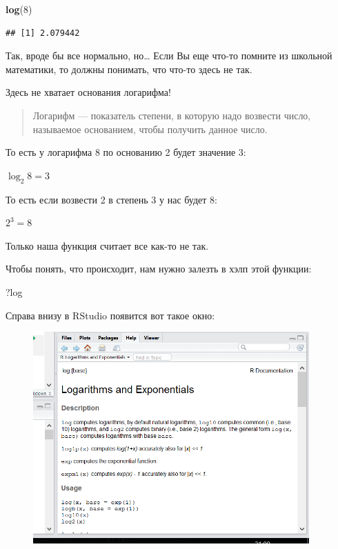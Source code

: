 \documentclass[]{book}
\newenvironment{Shaded}{\begin{snugshade}}{\end{snugshade}}
\newcommand{\KeywordTok}[1]{\textcolor[rgb]{0.13,0.29,0.53}{\textbf{#1}}}
\newcommand{\DecValTok}[1]{\textcolor[rgb]{0.00,0.00,0.81}{#1}}
\newcommand{\NormalTok}[1]{#1}
\begin{document}
\begin{Shaded}
\begin{Highlighting}[]
\KeywordTok{log}\NormalTok{(}\DecValTok{8}\NormalTok{)}
\end{Highlighting}
\end{Shaded}

\begin{verbatim}
## [1] 2.079442
\end{verbatim}

Так, вроде бы все нормально, но\ldots{} Если Вы еще что-то помните из
школьной математики, то должны понимать, что что-то здесь не так.

Здесь не хватает основания логарифма!

\begin{quote}
Логарифм --- показатель степени, в которую надо возвести число,
называемое основанием, чтобы получить данное число.
\end{quote}

То есть у логарифма 8 по основанию 2 будет значение 3:

\(\log_2 8 = 3\)

То есть если возвести 2 в степень 3 у нас будет 8:

\(2^3 = 8\)

Только наша функция считает все как-то не так.

Чтобы понять, что происходит, нам нужно залезть в хэлп этой функции:

\begin{Shaded}
\begin{Highlighting}[]
\NormalTok{?log}
\end{Highlighting}
\end{Shaded}

Справа внизу в RStudio появится вот такое окно:

\begin{figure}
\centering
\includegraphics[width=4.16667in]{images/help.png}
\caption{}
\end{figure}
\end{document}
